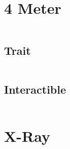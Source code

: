 \documentclass[main.tex]{subfiles}
\begin{document}
\section{4 Meter}

\begin{lstlisting}[language=FG]
\end{lstlisting}

\subsection{Trait}

\begin{lstlisting}[language=FG]
\end{lstlisting}


\subsection{Interactible}
\begin{lstlisting}[language=FG]

\end{lstlisting}

\section{X-Ray}
\end{document}
